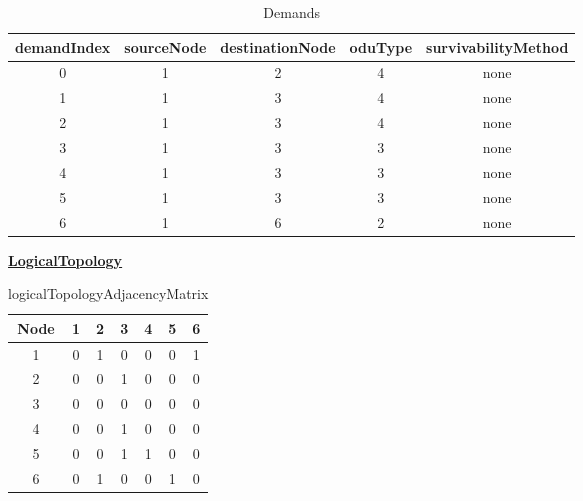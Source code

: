\begin{table}[H]
	\centering
	\begin{tabular}{| c | c | c | c | c |}
		\hline
		\textbf{demandIndex} & \textbf{sourceNode} & \textbf{destinationNode} & \textbf{oduType} & \textbf{survivabilityMethod}\\ \hline
		0                    & 1                   & 2                        & 4                & none						   \\ \hline
		1                    & 1                   & 3                        & 4                & none                        \\ \hline
		2                    & 1                   & 3                        & 4                & none                        \\ \hline
		3                    & 1                   & 3                        & 3                & none                        \\ \hline
		4                    & 1                   & 3                        & 3                & none                        \\ \hline
		5                    & 1                   & 3                        & 3                & none                        \\ \hline
		6                    & 1                   & 6                        & 2                & none                        \\ \hline
	\end{tabular}
	\caption{Demands}
	\label{demands}
\end{table}

\underline{\textbf{LogicalTopology}}

\begin{table}[H]
	\centering
	\begin{tabular}{| c | c | c | c | c | c | c |}
		\hline
		\textbf{Node} & 1 & 2 & 3 & 4 & 5 & 6 \\ \hline
		1             & 0 & 1 & 0 & 0 & 0 & 1 \\ \hline
		2             & 0 & 0 & 1 & 0 & 0 & 0 \\ \hline
		3             & 0 & 0 & 0 & 0 & 0 & 0 \\ \hline
		4			  & 0 & 0 & 1 & 0 & 0 & 0 \\ \hline	
		5    	      & 0 & 0 & 1 & 1 & 0 & 0 \\ \hline
		6			  & 0 & 1 & 0 & 0 & 1 & 0 \\ \hline
	\end{tabular}
	\caption{logicalTopologyAdjacencyMatrix}
	\label{logical_matrix}
\end{table}

